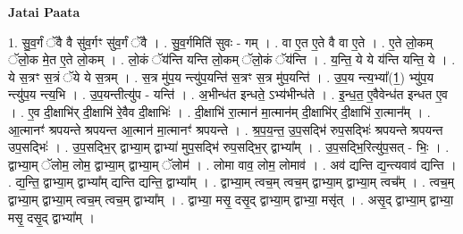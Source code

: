 \documentclass[17pt]{extarticle}
\begin{document}
\textbf{Jatai Paata} \newline

1. सु॒व॒र्गं ॅवै वै सु॑व॒र्गꣳ सु॑व॒र्गं ॅवै । . सु॒व॒र्गमिति॑ सुवः - गम् । . वा ए॒त ए॒ते वै वा ए॒ते । . ए॒ते लो॒कम् ॅलो॒क मे॒त ए॒ते लो॒कम् । . लो॒कं ॅय॑न्ति यन्ति लो॒कम् ॅलो॒कं ॅय॑न्ति । . य॒न्ति॒ ये ये य॑न्ति यन्ति॒ ये । . ये स॒त्रꣳ स॒त्रं ॅये ये स॒त्रम् । . स॒त्र मु॑प॒य न्त्यु॑प॒यन्ति॑ स॒त्रꣳ स॒त्र मु॑प॒यन्ति॑ । . उ॒प॒य न्त्य॒भ्या᳚(1॒) भ्यु॑प॒य न्त्यु॑प॒य न्त्य॒भि । . उ॒प॒यन्तीत्यु॑प - यन्ति॑ । . अ॒भीन्ध॑त इन्धते॒ ऽभ्य॑भीन्ध॑ते । . इ॒न्ध॒त॒ ए॒वैवेन्ध॑त इन्धत ए॒व । . ए॒व दी॒क्षाभि॑र् दी॒क्षाभि॑ रे॒वैव दी॒क्षाभिः॑ । . दी॒क्षाभि॑ रा॒त्मान॑ मा॒त्मान॑म् दी॒क्षाभि॑र् दी॒क्षाभि॑ रा॒त्मान᳚म् । . आ॒त्मानꣳ॑ श्रपयन्ते श्रपयन्त आ॒त्मान॑ मा॒त्मानꣳ॑ श्रपयन्ते । . श्र॒प॒य॒न्त॒ उ॒प॒सद्भि॑ रुप॒सद्भिः॑ श्रपयन्ते श्रपयन्त उप॒सद्भिः॑ । . उ॒प॒सद्भि॒र् द्वाभ्या॒म् द्वाभ्या॑ मुप॒सद्भि॑ रुप॒सद्भि॒र् द्वाभ्या᳚म् । . उ॒प॒सद्भि॒रित्यु॑प॒सत् - भिः॒ । . द्वाभ्या॒म् ॅलोम॒ लोम॒ द्वाभ्या॒म् द्वाभ्या॒म् ॅलोम॑ । . लोमा वाव॒ लोम॒ लोमाव॑ । . अव॑ द्यन्ति द्य॒न्त्यवाव॑ द्यन्ति । . द्य॒न्ति॒ द्वाभ्या॒म् द्वाभ्या᳚म् द्यन्ति द्यन्ति॒ द्वाभ्या᳚म् । . द्वाभ्या॒म् त्वच॒म् त्वच॒म् द्वाभ्या॒म् द्वाभ्या॒म् त्वच᳚म् । . त्वच॒म् द्वाभ्या॒म् द्वाभ्या॒म् त्वच॒म् त्वच॒म् द्वाभ्या᳚म् । . द्वाभ्या॒ मसृ॒ दसृ॒द् द्वाभ्या॒म् द्वाभ्या॒ मसृ॑त् । . असृ॒द् द्वाभ्या॒म् द्वाभ्या॒ मसृ॒ दसृ॒द् द्वाभ्या᳚म् । \newline
\end{document}
